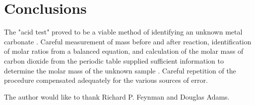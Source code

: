 \documentclass[
journal=aamick,
manuscript=article]{achemso}
\begin{document}
\section{Conclusions}
The "acid test" proved to be a viable method of identifying an unknown metal carbonate \cite{h}. Careful measurement of mass before and after reaction, identification of molar ratios from a balanced equation, and calculation of the molar mass of carbon dioxide from the periodic table supplied sufficient information to determine the molar mass of the unknown sample \cite{g}. Careful repetition of the procedure compensated adequately for the various sources of error.

\begin{acknowledgement}

The author would like to thank Richard P. Feynman and Douglas Adams.

\end{acknowledgement}



\end{document}
